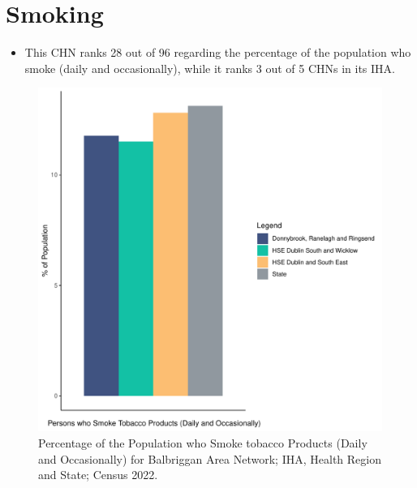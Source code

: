 \documentclass{article}
\begin{document}
\pagebreak

\section{Smoking}\label{sect:Smoking}
\begin{itemize}
\item This CHN ranks  28 out of 96 regarding the percentage of the population who smoke (daily and occasionally), while it ranks   3 out of 5 CHNs in its IHA.
\end{itemize}
\begin{figure}[H]
	\centering
	\includegraphics[width = 120mm]{../figures/SmokingED.pdf}
	\caption{Percentage of the Population who Smoke tobacco Products (Daily and Occasionally) for Balbriggan Area Network; IHA, Health Region and State; Census 2022.}
	\label{fig:2ae19629-1a6a-13a3-e055-000000000001}
	\end{figure}
	
\end{document}
